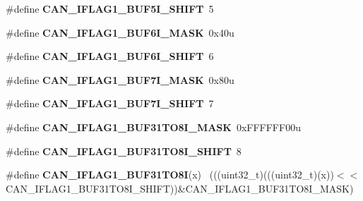 \begin{DoxyCompactItemize}
\item 
\hypertarget{group___c_a_n___register___masks_ga4eef45eb97993797f0e4d25d84ae98ae}{}\#define {\bfseries C\+A\+N\+\_\+\+I\+F\+L\+A\+G1\+\_\+\+B\+U\+F5\+I\+\_\+\+S\+H\+I\+F\+T}~5\label{group___c_a_n___register___masks_ga4eef45eb97993797f0e4d25d84ae98ae}

\item 
\hypertarget{group___c_a_n___register___masks_ga0aec3c62d96f6f8e8afd046065838df7}{}\#define {\bfseries C\+A\+N\+\_\+\+I\+F\+L\+A\+G1\+\_\+\+B\+U\+F6\+I\+\_\+\+M\+A\+S\+K}~0x40u\label{group___c_a_n___register___masks_ga0aec3c62d96f6f8e8afd046065838df7}

\item 
\hypertarget{group___c_a_n___register___masks_gac3a088607f853fdddfc0011293e1c336}{}\#define {\bfseries C\+A\+N\+\_\+\+I\+F\+L\+A\+G1\+\_\+\+B\+U\+F6\+I\+\_\+\+S\+H\+I\+F\+T}~6\label{group___c_a_n___register___masks_gac3a088607f853fdddfc0011293e1c336}

\item 
\hypertarget{group___c_a_n___register___masks_gacc148d0c9e26a80f08110dc2c5045809}{}\#define {\bfseries C\+A\+N\+\_\+\+I\+F\+L\+A\+G1\+\_\+\+B\+U\+F7\+I\+\_\+\+M\+A\+S\+K}~0x80u\label{group___c_a_n___register___masks_gacc148d0c9e26a80f08110dc2c5045809}

\item 
\hypertarget{group___c_a_n___register___masks_ga327609a9678df5c8c34053d43b550422}{}\#define {\bfseries C\+A\+N\+\_\+\+I\+F\+L\+A\+G1\+\_\+\+B\+U\+F7\+I\+\_\+\+S\+H\+I\+F\+T}~7\label{group___c_a_n___register___masks_ga327609a9678df5c8c34053d43b550422}

\item 
\hypertarget{group___c_a_n___register___masks_ga70c705b79c7bd7451ebdee6bc0ba6f1c}{}\#define {\bfseries C\+A\+N\+\_\+\+I\+F\+L\+A\+G1\+\_\+\+B\+U\+F31\+T\+O8\+I\+\_\+\+M\+A\+S\+K}~0x\+F\+F\+F\+F\+F\+F00u\label{group___c_a_n___register___masks_ga70c705b79c7bd7451ebdee6bc0ba6f1c}

\item 
\hypertarget{group___c_a_n___register___masks_gaeb0d9f42c855b318796736ab6cc2de75}{}\#define {\bfseries C\+A\+N\+\_\+\+I\+F\+L\+A\+G1\+\_\+\+B\+U\+F31\+T\+O8\+I\+\_\+\+S\+H\+I\+F\+T}~8\label{group___c_a_n___register___masks_gaeb0d9f42c855b318796736ab6cc2de75}

\item 
\hypertarget{group___c_a_n___register___masks_ga4355b6ce0f94c35f6a96ad4ad4165502}{}\#define {\bfseries C\+A\+N\+\_\+\+I\+F\+L\+A\+G1\+\_\+\+B\+U\+F31\+T\+O8\+I}(x)                                ~(((uint32\+\_\+t)(((uint32\+\_\+t)(x))$<$$<$C\+A\+N\+\_\+\+I\+F\+L\+A\+G1\+\_\+\+B\+U\+F31\+T\+O8\+I\+\_\+\+S\+H\+I\+F\+T))\&C\+A\+N\+\_\+\+I\+F\+L\+A\+G1\+\_\+\+B\+U\+F31\+T\+O8\+I\+\_\+\+M\+A\+S\+K)\label{group___c_a_n___register___masks_ga4355b6ce0f94c35f6a96ad4ad4165502}


\end{DoxyCompactItemize}
